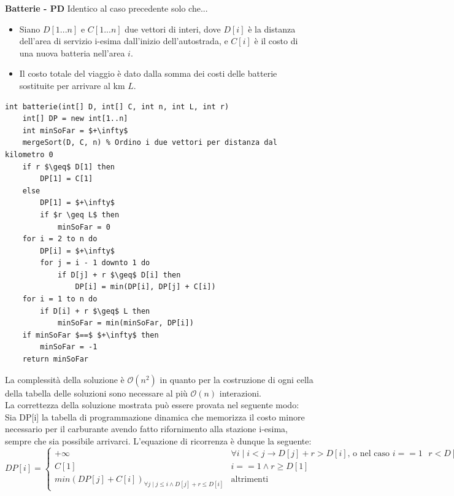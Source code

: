 \documentclass[../cheatSheetAlgoritmi.tex]{subfiles}
\begin{document}
\textbf{Batterie - PD}
Identico al caso precedente solo che...\\
\begin{itemize}
	\item Siano $D[1...n]$ e $C[1...n]$ due vettori di interi, dove $D[i]$ è la distanza dell'area di servizio i-esima dall’inizio dell’autostrada, e $C[i]$ è il costo di una nuova batteria nell'area $i$.
	\item Il costo totale del viaggio è dato dalla somma dei costi delle batterie sostituite per arrivare al km $L$.
\end{itemize}
\begin{lstlisting}[caption=Batterie PD]
int batterie(int[] D, int[] C, int n, int L, int r)
    int[] DP = new int[1..n]
    int minSoFar = $+\infty$
    mergeSort(D, C, n) % Ordino i due vettori per distanza dal kilometro 0
    if r $\geq$ D[1] then
        DP[1] = C[1]
    else
        DP[1] = $+\infty$
        if $r \geq L$ then
            minSoFar = 0
    for i = 2 to n do
        DP[i] = $+\infty$
        for j = i - 1 downto 1 do
            if D[j] + r $\geq$ D[i] then
                DP[i] = min(DP[i], DP[j] + C[i])
    for i = 1 to n do
        if D[i] + r $\geq$ L then
            minSoFar = min(minSoFar, DP[i])
    if minSoFar $==$ $+\infty$ then
        minSoFar = -1
    return minSoFar
\end{lstlisting}
La complessità della soluzione è $\mathcal{O}(n^2)$ in quanto per la costruzione di ogni cella della tabella delle soluzioni sono necessare al più $\mathcal{O}(n)$ interazioni. \\
La correttezza della soluzione mostrata può essere provata nel seguente modo: \\
Sia DP[i] la tabella di programmazione dinamica che memorizza il costo minore necessario per il carburante avendo fatto rifornimento alla stazione i-esima, sempre che sia possibile arrivarci. L'equazione di ricorrenza è dunque la seguente:
\begin{equation*}
    DP[i]=\begin{cases}
        + \infty & \text{$\forall i \mid i < j \rightarrow D[j] + r > D[i]$, o nel caso $i == 1$ $r < D[1]$} \\
        C[1] & \text{$i == 1 \land r \geq D[1]$}\\
        min(DP[j] + C[i])_{\forall j \mid j \leq i \land D[j] + r \leq D[i]} & \text{altrimenti}
    \end{cases}
\end{equation*} \\
\end{document}
